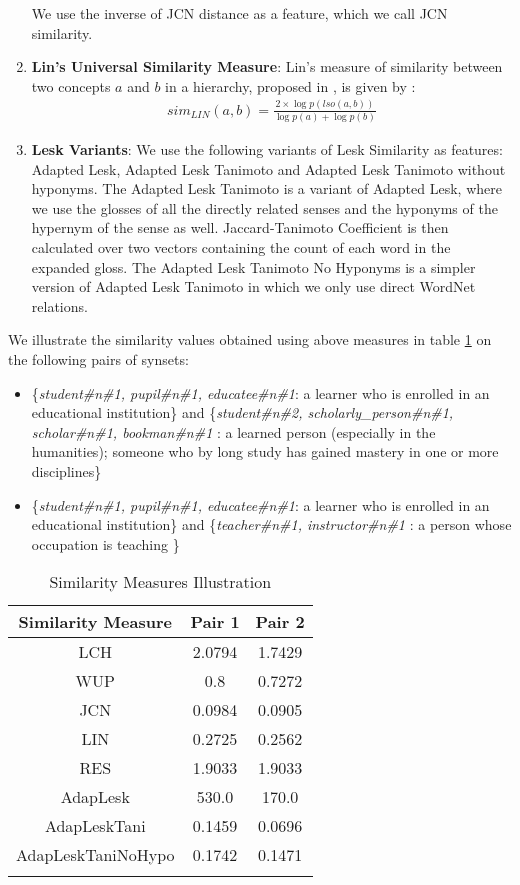\begin{enumerate}
We use the inverse of JCN distance as a feature, which we call JCN similarity.

\item \textbf{Lin's Universal Similarity Measure}: Lin's measure of similarity between two concepts $a$ and $b$ in a hierarchy, proposed in \citep{Lin:1998}, is given by :
\begin{align}
sim_{LIN}(a,b) = \frac{2 \times \log p(lso(a,b))}{\log p(a) + \log p(b)} \label{eq:Lin}
\end{align}

\item \textbf{Lesk Variants}: We use the following variants of Lesk Similarity \citep{Lesk:1986} as features: Adapted Lesk\citep{Banerjee:2002}, Adapted Lesk Tanimoto and Adapted Lesk Tanimoto without hyponyms. The Adapted Lesk Tanimoto is a variant of Adapted Lesk, where we use the glosses of all the directly related senses and the hyponyms of the hypernym of the sense as well. Jaccard-Tanimoto Coefficient is then calculated over two vectors containing the count of each word in the expanded gloss. The Adapted Lesk Tanimoto No Hyponyms is a simpler version of Adapted Lesk Tanimoto in which we only use direct WordNet relations.
\end{enumerate}

We illustrate the similarity values obtained using above measures in table \ref{tab:similarityMeasuresIllustration} on the following pairs of synsets: 
\begin{itemize}
\item \{\textit{student\#n\#1, pupil\#n\#1, educatee\#n\#1}: a learner who is enrolled in an educational institution\} and \{\textit{student\#n\#2, scholarly\_person\#n\#1, scholar\#n\#1, bookman\#n\#1} : a learned person (especially in the humanities); someone who by long study has gained mastery in one or more disciplines\}
\item \{\textit{student\#n\#1, pupil\#n\#1, educatee\#n\#1}: a learner who is enrolled in an educational institution\} and \{\textit{teacher\#n\#1, instructor\#n\#1} : a person whose occupation is teaching \}
\end{itemize}

\begin{center}
\begin{longtable}{| c | c | c |}  
\hline
\textbf{Similarity Measure} & \textbf{Pair 1} & \textbf{Pair 2} \\ \hline
LCH & 2.0794 & 1.7429 \\ \hline
WUP & 0.8 & 0.7272 \\ \hline
JCN & 0.0984 & 0.0905  \\ \hline
LIN & 0.2725 & 0.2562 \\ \hline
RES & 1.9033 & 1.9033 \\ \hline
AdapLesk & 530.0 & 170.0 \\ \hline
AdapLeskTani & 0.1459 & 0.0696 \\ \hline
AdapLeskTaniNoHypo & 0.1742 & 0.1471 \\ \hline
\caption{Similarity Measures Illustration}
\label{tab:similarityMeasuresIllustration}
\end{longtable}
\end{center}

